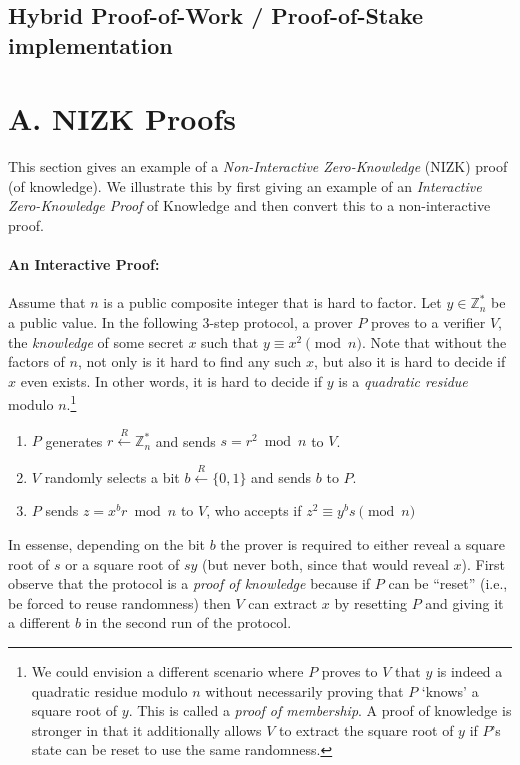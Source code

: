 \documentclass[]{report}   %
\newcommand{\rand}{\stackrel{R}{\leftarrow}}
\begin{document}
\subsection{Hybrid Proof-of-Work / Proof-of-Stake implementation}




\appendix
\section*{A. NIZK Proofs}

This section gives an example of a {\em Non-Interactive Zero-Knowledge} (NIZK) proof (of knowledge). We illustrate this by first giving an example of an {\em Interactive Zero-Knowledge Proof} of Knowledge and then convert this to a non-interactive proof. 

\paragraph{An Interactive Proof:} Assume that $n$ is a public composite integer that is hard to factor.
Let $y\in \mathbb{Z}^*_n$ be a public value. In the following 3-step protocol, a prover $P$ proves to a verifier $V$, the {\em knowledge} of some secret $x$ such that $y\equiv x^2 \pmod{n}$.
Note that without the factors of $n$, not only is it hard to find any such $x$, but also it is hard to decide if $x$ even exists. In other words, it is hard to decide if $y$ is a {\em  quadratic residue} modulo $n$.\footnote{We could envision a different scenario where $P$ proves to $V$ that $y$ is indeed a quadratic residue modulo $n$ without necessarily proving that $P$ `knows' a square root of $y$. This is called a {\em proof of membership}. A proof of knowledge is stronger in that it additionally allows $V$ to extract the square root of $y$ if $P$'s state can be reset to use the same randomness.}


\begin{enumerate}
	\item $P$ generates $r\rand \mathbb{Z}^*_n$ and sends $s = r^2\bmod{n}$ to $V$.
	\item $V$ randomly selects a bit $b\rand \{0, 1\}$ and sends $b$ to $P$.
	\item $P$ sends $z=x^br \bmod{n}$ to $V$, who accepts if $z^2 \equiv y^bs\pmod{n}$
\end{enumerate}

In essense, depending on the bit $b$ the prover is required to either reveal a square root of $s$ or a square root of $sy$ (but never both, since that would reveal $x$). 
First observe that the protocol is a {\em proof of knowledge} because if $P$ can be ``reset'' (i.e., be forced to reuse randomness) then $V$ can extract $x$ by resetting $P$ and giving it a different $b$ in the second run of the protocol. 
\end{document}

